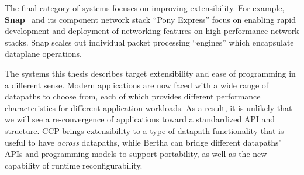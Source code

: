 The final category of systems focuses on improving extensibility. For example, \textbf{Snap}~\cite{snap} and its component network stack ``Pony Express'' focus on enabling rapid development and deployment of networking features on high-performance network stacks. 
Snap scales out individual packet processing ``engines'' which encapsulate dataplane operations.

The systems this thesis describes target extensibility and ease of programming in a different sense. Modern applications are now faced with a wide range of datapaths to choose from, each of which provides different performance characteristics for different application workloads. As a result, it is unlikely that we will see a re-convergence of applications toward a standardized API and structure. 
CCP brings extensibility to a type of datapath functionality that is useful to have \emph{across} datapaths, while Bertha can bridge different datapaths' APIs and programming models to support portability, as well as the new capability of runtime reconfigurability.
